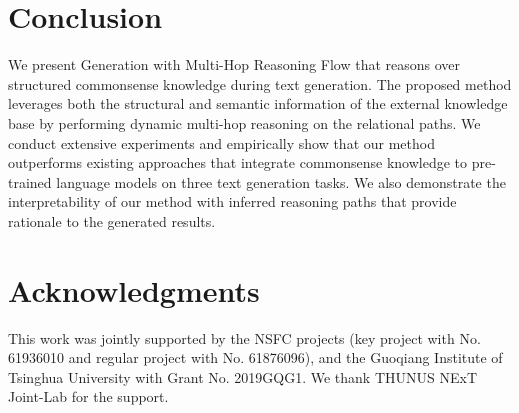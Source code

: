 \documentclass[11pt,a4paper]{article}
\begin{document}
\section{Conclusion}

We present Generation with Multi-Hop Reasoning Flow that reasons over structured commonsense knowledge during text generation. %
The proposed method leverages both the structural and semantic information of the external knowledge base by performing dynamic multi-hop reasoning on the relational paths. We conduct extensive experiments and empirically show that our method outperforms existing approaches that integrate commonsense knowledge to pre-trained language models on three text generation tasks. We also demonstrate the interpretability of our method with inferred reasoning paths that provide rationale to the generated results.
 
\section*{Acknowledgments}

This work was jointly supported by the NSFC projects (key project with No. 61936010 and regular project with No. 61876096), and the Guoqiang Institute of Tsinghua University with Grant No. 2019GQG1. We thank THUNUS NExT Joint-Lab for the support.



\end{document}
